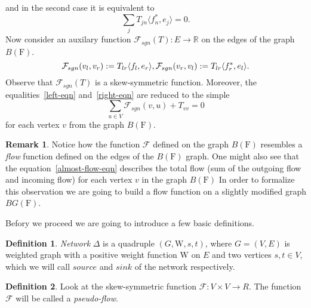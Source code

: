 \documentclass[12pt]{article}
\theoremstyle{definition}
\newtheorem{remark}{Remark}
\newtheorem{definition}{Definition}
\newcommand{\fsys}{\mathrm{F}}
\newcommand{\wt}{\mathrm{W}}
\newcommand{\flow}{\mathcal{F}}
\newcommand{\flowsgn}{\mathcal{F}_{sgn}}
\newcommand{\source}{\mathit{source}}
\newcommand{\sink}{\mathit{sink}}
\newcommand{\net}{\Delta}
\numberwithin{remark}{section}
\numberwithin{theorem}{section}
\numberwithin{prop}{section}
\numberwithin{equation}{section}
\numberwithin{lemma}{section}
\numberwithin{prop_under_lemma}{lemma}
\begin{document}
    and in the second case it is equivalent to 
    \begin{equation}
        \label{right-eqn}
        \sum_j T_{jn} \langle f^*_n, e_j \rangle = 0.
    \end{equation}
    Now consider an auxilary function $\flowsgn(T): E \to \mathbb{R}$ 
    on the edges of the graph $B(\fsys)$.
    \begin{equation*}
        \flowsgn(v_l, v_r) := T_{lr} \langle f_l, e_r \rangle,\\
        \flowsgn(v_r, v_l) := T_{lr} \langle f^*_r, e_l \rangle.
    \end{equation*}
    Observe that $\flowsgn(T)$ is a skew-symmetric function.
    Moreover, the equalities~\eqref{left-eqn} and~\eqref{right-eqn} are reduced to the simple
    \begin{equation}
      \label{almost-flow-eqn}
      \sum_{u \in V} \flowsgn(v, u) + T_{vv} = 0
    \end{equation}
    for each vertex $v$ from the graph $B(\fsys)$.
    \begin{remark}
      Notice how the function $\flow$ defined on the graph $B(\fsys)$ resembles
      a \emph{flow} function defined on the edges of the $B(\fsys)$ graph.
      One might also see that the equation~\eqref{almost-flow-eqn} describes the total flow (sum of the outgoing flow and incoming flow) 
      for each vertex $v$ in the graph $B(\fsys)$
      In order to formalize this observation we are going to build a flow function
      on a slightly modified graph $BG(\fsys)$.
    \end{remark}
    Befory we proceed we are going to introduce a few basic definitions.
    \begin{definition}
        \textit{Network} $\net$ is a quadruple $(G, \wt, s, t)$, where $G = (V, E)$ is weighted graph 
        with a positive weight function $\wt$ on $E$ and two vertices $s, t \in V$, which
        we will call $\source$ and $\sink$ of the network respectively.
    \end{definition}
    \begin{definition}
        Look at the skew-symmetric function $\flow: V \times V \to R$.
        The function $\flow$ will be called a \textit{pseudo-flow}.
    \end{definition}
\end{document}
